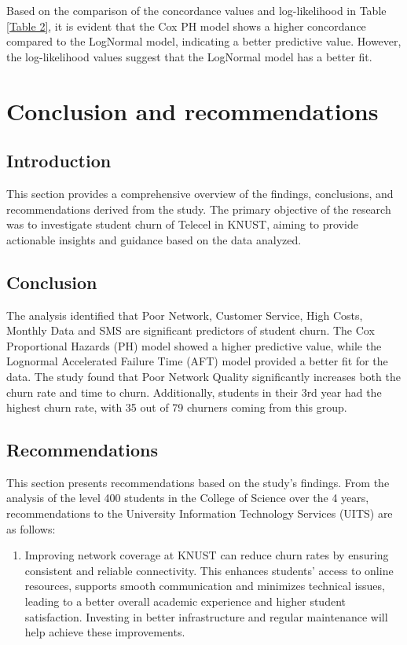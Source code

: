 \documentclass[doublespacing,12pt]{report}
\begin{document}
{\begin{table}[H]
		\end{table}

\normalsize{\noindent Based on the comparison of the concordance values and log-likelihood in Table \ref{Table 2}, it is evident that the Cox PH model shows a higher concordance compared to the LogNormal model, indicating a better predictive value. However, the log-likelihood values suggest that the LogNormal model has a better fit. }

\newpage
\chapter{Conclusion and recommendations}

\section{Introduction}
\normalsize{ This section provides a comprehensive overview of the findings, conclusions, and recommendations derived from the study. The primary objective of the research was to investigate student churn of Telecel in KNUST, aiming to provide actionable insights and guidance based on the data analyzed.}

\section{Conclusion}
\normalsize{The analysis identified that Poor Network, Customer Service, High Costs, Monthly Data and SMS are significant predictors of student churn. The Cox Proportional Hazards (PH) model showed a higher predictive value, while the Lognormal Accelerated Failure Time (AFT) model provided a better fit for the data. The study found that Poor Network Quality significantly increases both the churn rate and time to churn. Additionally, students in their 3rd year had the highest churn rate, with 35 out of 79 churners coming from this group.}

 



\section{Recommendations}
\normalsize{This section presents recommendations based on the study’s findings. From the analysis of the level 400 students in the College of Science over the 4 years, recommendations to the University Information Technology Services (UITS)  are as follows:}
\begin{enumerate}
        \item \normalsize{Improving network coverage at KNUST can reduce churn rates by ensuring consistent and reliable connectivity. This enhances students' access to online resources, supports smooth communication and minimizes technical issues, leading to a better overall academic experience and higher student satisfaction. Investing in better infrastructure and regular maintenance will help achieve these improvements}.


\end{enumerate}}
\end{document}

